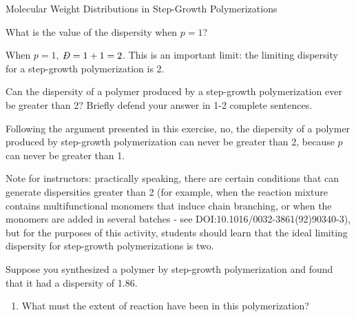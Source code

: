 \begin{activity}{Molecular Weight Distributions in Step-Growth Polymerizations}
\begin{ctqs}
\begin{solution}[1.5in]
			\end{solution}
			
			
		\question What is the value of the dispersity when $p=1$?
		
			\begin{solution}[1in]
			
				When $p=1$, $\PDImath=1+1=2$.  This is an important limit: the limiting dispersity for a step-growth polymerization is 2.
			
			\end{solution}
			
			
			
		\question Can the dispersity of a polymer produced by a step-growth polymerization ever be greater than 2?  Briefly defend your answer in 1-2 complete sentences.
		
			\begin{solution}[1.5in]
			
				Following the argument presented in this exercise, no, the dispersity of a polymer produced by step-growth polymerization can never be greater than 2, because $p$ can never be greater than 1. 
				
				Note for instructors: practically speaking, there are certain conditions that can generate dispersities greater than 2 (for example, when the reaction mixture contains multifunctional monomers that induce chain branching, or when the monomers are added in several batches - see DOI:10.1016/0032-3861(92)90340-3), but for the purposes of this activity, students should learn that the ideal limiting dispersity for step-growth polymerizations is two.
			
			\end{solution}
			
			
\end{ctqs}

\begin{exercises}

		\exercise Suppose you synthesized a polymer by step-growth polymerization and found that it had a dispersity of 1.86.
		
			\begin{enumerate}
				\item What must the extent of reaction have been in this polymerization?
		
					\begin{solution}
					\end{solution}
					

\end{enumerate}
\end{exercises}
\end{activity}
